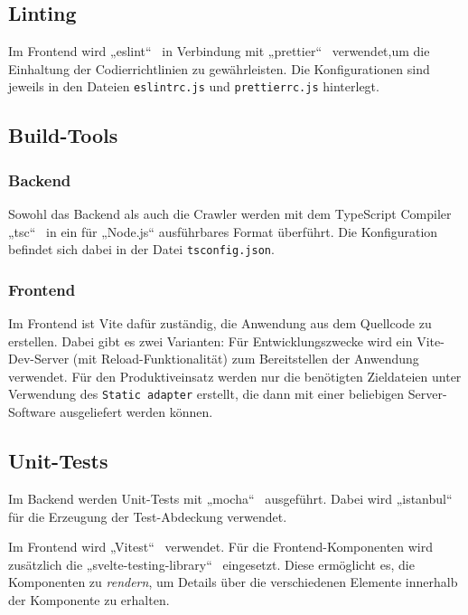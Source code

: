 \documentclass[a4paper, 10pt, conference]{IEEEtran}
\begin{document}
\subsection{Linting}

Im Frontend wird „eslint“~\cite{eslint} in Verbindung mit „prettier“~\cite{prettier} verwendet,um die Einhaltung der Codierrichtlinien zu gewährleisten. Die Konfigurationen sind jeweils in den Dateien \texttt{eslintrc.js} und \texttt{prettierrc.js} hinterlegt.

\subsection{Build-Tools}

\subsubsection{Backend}

Sowohl das Backend als auch die Crawler werden mit dem TypeScript Compiler „tsc“~\cite{typescript} in ein für „Node.js“ ausführbares Format überführt. Die Konfiguration befindet sich dabei in der Datei \texttt{tsconfig.json}.

\subsubsection{Frontend}
Im Frontend ist Vite dafür zuständig, die Anwendung aus dem Quellcode zu erstellen. Dabei gibt es zwei Varianten: Für Entwicklungszwecke wird ein Vite-Dev-Server (mit Reload-Funktionalität) zum Bereitstellen der Anwendung verwendet. Für den Produktiveinsatz werden nur die benötigten Zieldateien unter Verwendung des \texttt{Static adapter} erstellt, die dann mit einer beliebigen Server-Software ausgeliefert werden können.

\subsection{Unit-Tests}

Im Backend werden Unit-Tests mit „mocha“~\cite{mochajs} ausgeführt. Dabei wird „istanbul“ \cite{istanbuljs} für die Erzeugung der Test-Abdeckung verwendet.

Im Frontend wird „Vitest“~\cite{vitest} verwendet. Für die Frontend-Komponenten wird zusätzlich die „svelte-testing-library“~ \cite{stl} eingesetzt. Diese ermöglicht es, die Komponenten zu \textit{rendern}, um Details über die verschiedenen Elemente innerhalb der Komponente zu erhalten.
\end{document}
